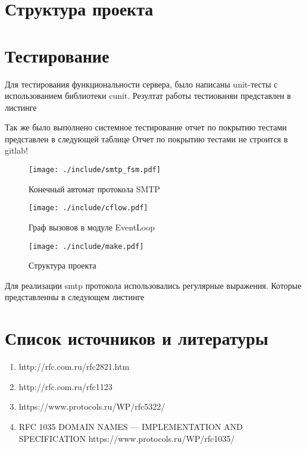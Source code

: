 \documentclass[a4paper,12pt]{extreport}
\begin{document}
	\section{Структура проекта}
	
	\section{Тестирование}
		Для тестирования функциональности сервера, было написаны unit-тесты
		с использованием библиотеки cunit. Резултат работы тестиованяи представлен
		в листинге 
		
		Так же было выполнено системное тестирование
		отчет по покрытию тестами представлен в следующей таблице
		Отчет по покрытию тестами не строится в  gitlab!

	\begin{figure}
	\centering
	\texttt{[image: ./include/smtp\_fsm.pdf]}
	\caption{Конечный автомат протокола SMTP}
	\label{fig:smtp_fsm}
	\end{figure}

	\begin{figure}
	\centering
	\texttt{[image: ./include/cflow.pdf]}
	\caption{Граф вызовов в модуле EventLoop}
	\label{fig:event}
	\end{figure}

	\begin{figure}
	\centering
	\texttt{[image: ./include/make.pdf]}
	\caption{Структура проекта}
	\label{fig:make_server}
	\end{figure}

	Для реализации smtp протокола использовались регулярные выражения. Которые представленны в следующем листинге
	

	\section{Список источников и литературы}
	\begin{enumerate}
		\item http://rfc.com.ru/rfc2821.htm
		\item http://rfc.com.ru/rfc1123
		\item https://www.protocols.ru/WP/rfc5322/
		\item RFC 1035 DOMAIN NAMES — IMPLEMENTATION AND SPECIFICATION  https://www.protocols.ru/WP/rfc1035/
	\end{enumerate}
\end{document}
